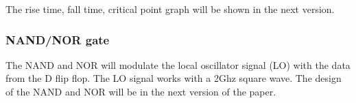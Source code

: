 The rise time, fall time, critical point graph will be shown in the next version. 

\subsubsection{NAND/NOR gate}\label{sec:frontend}
The NAND and NOR will modulate the local oscillator signal (LO) with the data from the D flip flop. The LO signal works with a 2Ghz square wave. 
The design of the NAND and NOR will be in the next version of the paper.


